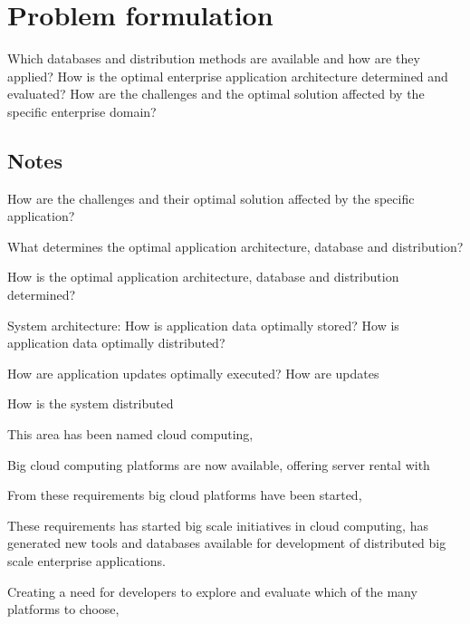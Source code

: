 \section{Problem formulation}
\label{sc:problem_formulation}
Which databases and distribution methods are available and how are they applied? 
How is the optimal enterprise application architecture determined and evaluated? 
How are the challenges and the optimal solution affected by the specific enterprise domain?

\subsection*{Notes}
How are the challenges and their optimal solution affected by the specific application?

What determines the optimal application architecture, database and distribution?

How is the optimal application architecture, database and distribution determined?

System architecture:
How is application data optimally stored?
How is application data optimally distributed?

How are application updates optimally executed?
How are updates 

How is the system distributed

This area has been named cloud computing, 

Big cloud computing platforms are now available, offering server rental with 

From these requirements big cloud platforms have been started, 

These requirements has started big scale initiatives in cloud computing, has generated new tools and databases available for development of distributed big scale enterprise applications. 

Creating a need for developers to explore and evaluate which of the many platforms to choose, 